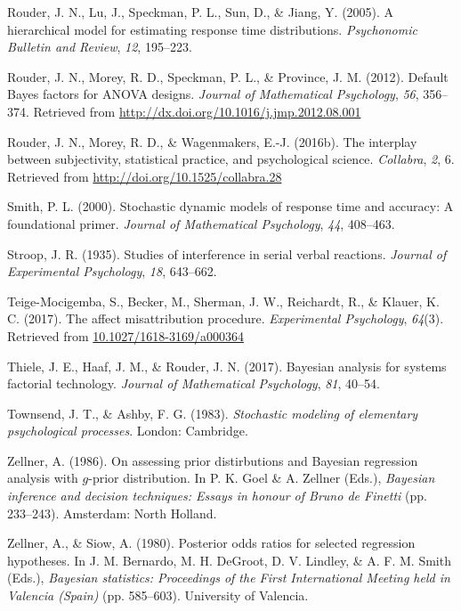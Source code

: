 \documentclass[english,,man]{apa6}
\begin{document}
\leavevmode\hypertarget{ref-Rouder:etal:2005a}{}%
Rouder, J. N., Lu, J., Speckman, P. L., Sun, D., \& Jiang, Y. (2005). A hierarchical model for estimating response time distributions. \emph{Psychonomic Bulletin and Review}, \emph{12}, 195--223.

\leavevmode\hypertarget{ref-Rouder:etal:2012}{}%
Rouder, J. N., Morey, R. D., Speckman, P. L., \& Province, J. M. (2012). Default Bayes factors for ANOVA designs. \emph{Journal of Mathematical Psychology}, \emph{56}, 356--374. Retrieved from \url{http://dx.doi.org/10.1016/j.jmp.2012.08.001}

\leavevmode\hypertarget{ref-Rouder:etal:2016b}{}%
Rouder, J. N., Morey, R. D., \& Wagenmakers, E.-J. (2016b). The interplay between subjectivity, statistical practice, and psychological science. \emph{Collabra}, \emph{2}, 6. Retrieved from \url{http://doi.org/10.1525/collabra.28}

\leavevmode\hypertarget{ref-Smith:2000}{}%
Smith, P. L. (2000). Stochastic dynamic models of response time and accuracy: A foundational primer. \emph{Journal of Mathematical Psychology}, \emph{44}, 408--463.

\leavevmode\hypertarget{ref-Stroop:1935}{}%
Stroop, J. R. (1935). Studies of interference in serial verbal reactions. \emph{Journal of Experimental Psychology}, \emph{18}, 643--662.

\leavevmode\hypertarget{ref-Teige-Mocigemba:etal:2017}{}%
Teige-Mocigemba, S., Becker, M., Sherman, J. W., Reichardt, R., \& Klauer, K. C. (2017). The affect misattribution procedure. \emph{Experimental Psychology}, \emph{64}(3). Retrieved from \url{10.1027/1618-3169/a000364}

\leavevmode\hypertarget{ref-Thiele:etal:2017}{}%
Thiele, J. E., Haaf, J. M., \& Rouder, J. N. (2017). Bayesian analysis for systems factorial technology. \emph{Journal of Mathematical Psychology}, \emph{81}, 40--54.

\leavevmode\hypertarget{ref-Townsend:Ashby:1983}{}%
Townsend, J. T., \& Ashby, F. G. (1983). \emph{Stochastic modeling of elementary psychological processes}. London: Cambridge.

\leavevmode\hypertarget{ref-Zellner:1986}{}%
Zellner, A. (1986). On assessing prior distirbutions and Bayesian regression analysis with \(g\)-prior distribution. In P. K. Goel \& A. Zellner (Eds.), \emph{Bayesian inference and decision techniques: Essays in honour of Bruno de Finetti} (pp. 233--243). Amsterdam: North Holland.

\leavevmode\hypertarget{ref-Zellner:Siow:1980}{}%
Zellner, A., \& Siow, A. (1980). Posterior odds ratios for selected regression hypotheses. In J. M. Bernardo, M. H. DeGroot, D. V. Lindley, \& A. F. M. Smith (Eds.), \emph{Bayesian statistics: Proceedings of the First International Meeting held in Valencia (Spain)} (pp. 585--603). University of Valencia.
\end{document}
